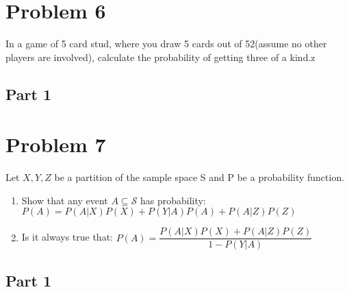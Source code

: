\documentclass{article}
\begin{document}
\section*{Problem 6}
In a game of 5 card stud, where you draw 5 cards out of 52(assume no other players are involved), calculate the probability of getting three of a kind.z
\subsection*{Part 1}

\clearpage
\section*{Problem 7}
Let $X,Y,Z$ be a partition of the sample space S and P be a probability function.

    \begin{enumerate}
    \item
    Show that any event $A\subseteq \mathcal{S}$ has probability: $P(A) = P(A|X)P(X)+P(Y|A)P(A)+P(A|Z)P(Z)$
    \item
    Is it always true that: $P(A) = \dfrac{P(A|X)P(X)+P(A|Z)P(Z)}{1-P(Y|A)}$
    \end{enumerate}
\subsection*{Part 1}
\end{document}
